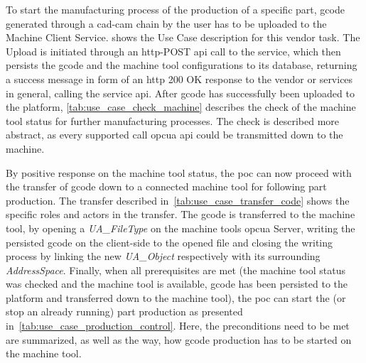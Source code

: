 \documentclass[
a4paper,
twoside,
headsepline,
cleardoublepage=empty,
parskip=half,
draft=false
]{scrbook}
\begin{document}
				To start the manufacturing process of the production of a specific part, \gls{gcode} generated through a \gls{cad}-\gls{cam} chain by the user has to be uploaded to the Machine Client Service.  shows the Use Case description for this vendor task. The Upload is initiated through an \gls{http}-POST \gls{api} call to the service, which then persists the \gls{gcode} and the machine tool configurations to its database, returning a success message in form of an \gls{http} 200 OK response to the vendor or services in general, calling the service \gls{api}.
				After \gls{gcode} has successfully been uploaded to the platform, \cref{tab:use_case_check_machine} describes the check of the machine tool status for further manufacturing processes. The check is described more abstract, as every supported call \gls{opcua} \gls{api} could be transmitted down to the machine.
				
				By positive response on the machine tool status, the \gls{poc} can now proceed with the transfer of \gls{gcode} down to a connected machine tool for following part production. The transfer described in~\cref{tab:use_case_transfer_code} shows the specific roles and actors in the transfer. The \gls{gcode} is transferred to the machine tool, by opening a \textit{UA\_FileType} on the machine tools \gls{opcua} Server, writing the persisted \gls{gcode} on the client-side to the opened file and closing the writing process by linking the new \textit{UA\_Object} respectively with its surrounding \textit{AddressSpace}.
				Finally, when all prerequisites are met (the machine tool status was checked and the machine tool is available, \gls{gcode} has been persisted to the platform and transferred down to the machine tool), the \gls{poc} can start the (or stop an already running) part production as presented in~\cref{tab:use_case_production_control}. Here, the preconditions need to be met are summarized, as well as the way, how \gls{gcode} production has to be started on the machine tool.
				
\end{document}
